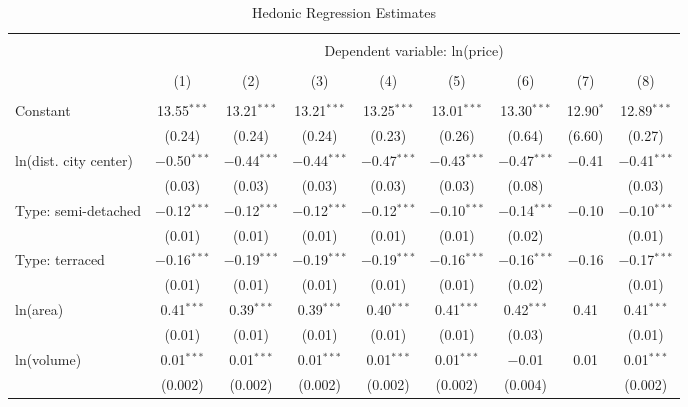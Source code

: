 
\begin{table}[!htbp] \centering 
  \caption{Hedonic Regression Estimates} 
  \label{tab:hedreg_year_loc_int} 
\footnotesize 
\begin{tabular}{@{\extracolsep{5pt}}lcccccccc} 
\\[-1.8ex]\hline 
\hline \\[-1.8ex] 
 & \multicolumn{8}{c}{Dependent variable: ln(price)} \\ 
\cline{2-9} 
\\[-1.8ex] & (1) & (2) & (3) & (4) & (5) & (6) & (7) & (8)\\ 
\hline \\[-1.8ex] 
 Constant & 13.55$^{***}$ & 13.21$^{***}$ & 13.21$^{***}$ & 13.25$^{***}$ & 13.01$^{***}$ & 13.30$^{***}$ & 12.90$^{*}$ & 12.89$^{***}$ \\ 
  & (0.24) & (0.24) & (0.24) & (0.23) & (0.26) & (0.64) & (6.60) & (0.27) \\ 
  ln(dist. city center) & $-$0.50$^{***}$ & $-$0.44$^{***}$ & $-$0.44$^{***}$ & $-$0.47$^{***}$ & $-$0.43$^{***}$ & $-$0.47$^{***}$ & $-$0.41 & $-$0.41$^{***}$ \\ 
  & (0.03) & (0.03) & (0.03) & (0.03) & (0.03) & (0.08) &  & (0.03) \\ 
  Type: semi-detached & $-$0.12$^{***}$ & $-$0.12$^{***}$ & $-$0.12$^{***}$ & $-$0.12$^{***}$ & $-$0.10$^{***}$ & $-$0.14$^{***}$ & $-$0.10 & $-$0.10$^{***}$ \\ 
  & (0.01) & (0.01) & (0.01) & (0.01) & (0.01) & (0.02) &  & (0.01) \\ 
  Type: terraced & $-$0.16$^{***}$ & $-$0.19$^{***}$ & $-$0.19$^{***}$ & $-$0.19$^{***}$ & $-$0.16$^{***}$ & $-$0.16$^{***}$ & $-$0.16 & $-$0.17$^{***}$ \\ 
  & (0.01) & (0.01) & (0.01) & (0.01) & (0.01) & (0.02) &  & (0.01) \\ 
  ln(area) & 0.41$^{***}$ & 0.39$^{***}$ & 0.39$^{***}$ & 0.40$^{***}$ & 0.41$^{***}$ & 0.42$^{***}$ & 0.41 & 0.41$^{***}$ \\ 
  & (0.01) & (0.01) & (0.01) & (0.01) & (0.01) & (0.03) &  & (0.01) \\ 
  ln(volume) & 0.01$^{***}$ & 0.01$^{***}$ & 0.01$^{***}$ & 0.01$^{***}$ & 0.01$^{***}$ & $-$0.01 & 0.01 & 0.01$^{***}$ \\ 
  & (0.002) & (0.002) & (0.002) & (0.002) & (0.002) & (0.004) &  & (0.002) \\ 

\end{tabular}
\end{table}
